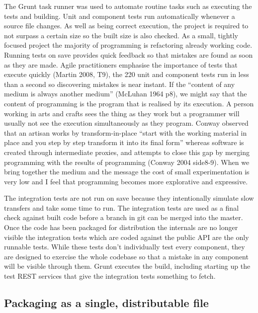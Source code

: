 \documentclass[]{article}
\begin{document}
The Grunt task runner was used to automate routine tasks such as
executing the tests and building. Unit and component tests run
automatically whenever a source file changes. As well as being correct
execution, the project is required to not surpass a certain size so the
built size is also checked. As a small, tightly focused project the
majority of programming is refactoring already working code. Running
tests on save provides quick feedback so that mistakes are found as soon
as they are made. Agile practitioners emphasise the importance of tests
that execute quickly (Martin 2008, T9), the 220 unit and component tests
run in less than a second so discovering mistakes is near instant. If
the ``content of any medium is always another medium'' (McLuhan 1964
p8), we might say that the content of programming is the program that is
realised by its execution. A person working in arts and crafts sees the
thing as they work but a programmer will usually not see the execution
simultaneously as they program. Conway observed that an artisan works by
transform-in-place ``start with the working material in place and you
step by step transform it into its final form'' whereas software is
created through intermediate proxies, and attempts to close this gap by
merging programming with the results of programming (Conway 2004
side8-9). When we bring together the medium and the message the cost of
small experimentation is very low and I feel that programming becomes
more explorative and expressive.

The integration tests are not run on save because they intentionally
simulate slow transfers and take some time to run. The integration tests
are used as a final check against built code before a branch in git can
be merged into the master. Once the code has been packaged for
distribution the internals are no longer visible the integration tests
which are coded against the public API are the only runnable tests.
While these tests don't individually test every component, they are
designed to exercise the whole codebase so that a mistake in any
component will be visible through them. Grunt executes the build,
including starting up the test REST services that give the integration
tests something to fetch.

\subsection{Packaging as a single, distributable file}
\end{document}
